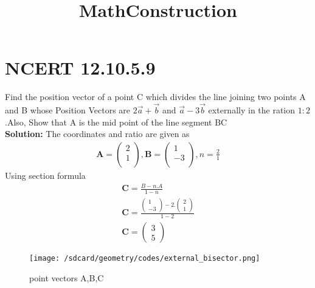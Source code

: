 \documentclass{article}
\title{MathConstruction}
\newcommand{\myvec}[1]{\ensuremath{\begin{pmatrix}#1\end{pmatrix}}}
\let\vec\mathbf
\begin{document}
\section{NCERT 12.10.5.9}

Find the position vector of a point C which divides the line joining two points A and B whose Position Vectors are $2\overrightarrow{a}+\overrightarrow{b}$ and $\overrightarrow{a}-3\overrightarrow{b}$ externally in the ration $1:2$.Also, Show that A is the mid point of the line segment BC \\
\textbf{Solution:}
The coordinates and ratio are given as
\begin{align}
\vec{A}=\myvec{2\\1\\},
\vec{B}=\myvec{1\\-3\\},
n=\frac{2}{1}
\end{align}
Using section formula
\begin{align}
    \vec{C}=\frac{B-n.A}{1-n}\\
    \vec{C}=\frac{\myvec{1\\-3}-2.\myvec{2\\1}}{1-2}\\
    \vec{C}=\myvec{3\\5}
\end{align}
\begin{enumerate}
    \begin{figure}[!ht]
       \centering
       \texttt{[image: /sdcard/geometry/codes/external\_bisector.png]}
       \caption{point vectors A,B,C}
       \label{fig:enter-label}
    \end{figure}
\end{enumerate}
\end{document}
